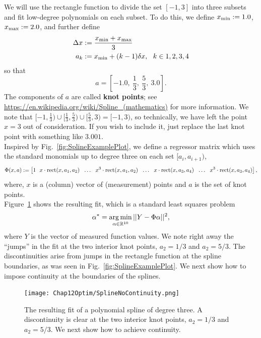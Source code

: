 We will use the rectangle function to divide the set $[-1, 3]$ into three subsets and fit low-degree polynomials on each subset. To do this, we define $x_{\rm min}:=1.0$, $x_{\rm max}:=2.0 $, and further define 
\begin{align*}
\Delta x&:=  \frac{x_{\rm min} + x_{\rm max}}{3}\\
a_k &:= x_{\rm min} + (k-1) \delta x,~~k\in {1, 2, 3, 4}
\end{align*}
so that 
$$a= [-1.0,~ \frac{1}{3}, ~\frac{5}{3}, ~3.0]. $$
The components of $a$ are called \textbf{knot points}; see \url{https://en.wikipedia.org/wiki/Spline_(mathematics)} for more information. We note that $[-1,\frac{1}{3}) \cup [\frac{1}{3}, \frac{5}{3}) \cup [\frac{5}{3}, 3) = [-1, 3) $, so technically, we have left the point $x=3$ out of consideration. If you wish to include it, just replace the last knot point with something like $3.001$.\\

Inspired by Fig.~\ref{fig:SplineExamplePlot}, we define a regressor matrix which uses the standard monomials up to degree three on each set $[a_i, a_{i+1})$,
\begin{equation}
    \label{eq:SplieRegressor}
   \Phi(x,a): = \left[1~~x \cdot {\rm rect}(x, a_1, a_2)~~\ldots~~x^3 \cdot {\rm rect}(x, a_1, a_2)~~\ldots~~ x \cdot  {\rm rect}(x, a_3, a_4)~~\ldots~~x^3 \cdot {\rm rect}(x, a_3, a_4)\right],
\end{equation}
where, $x$ is a (column) vector of (measurement) points and $a$ is the set of knot points.\\

Figure~\ref{fig:SplineNoContinuity} shows the resulting fit, which is a standard least squares problem
 $$ \alpha^\ast = \operatorname*{arg\,min}_{\alpha \in \mathbb R^{10}} || Y - \Phi \alpha||^2, $$
 where $Y$ is the vector of measured function values. We note right away the ``jumps'' in the fit at the two interior knot points,  $a_2=1/3$ and $a_2=5/3$. The discontinuities arise from jumps in the rectangle function at the spline boundaries, as was seen in Fig.~\ref{fig:SplineExamplePlot}. We next show how to impose continuity at the boundaries of the splines.
\begin{figure}[hbt]%
\centering
\texttt{[image: Chap12Optim/SplineNoContinuity.png]}%
\caption[]{The resulting fit of a polynomial spline of degree three. A discontinuity is clear at the two interior knot points, $a_2=1/3$ and $a_2=5/3$. We next show how to achieve continuity.    
}    
\label{fig:SplineNoContinuity}
\end{figure}


